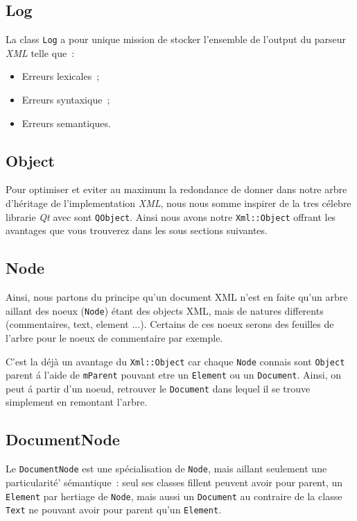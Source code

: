     \subsection{Log}
        La class \lstinline$Log$ a pour unique mission de stocker l'ensemble de l'output du parseur \textit{XML} telle que~:

        \begin{itemize}
            \item Erreurs lexicales~;
            \item Erreurs syntaxique~;
            \item Erreurs semantiques.
        \end{itemize}

    \subsection{Object}
        Pour optimiser et eviter au maximum la redondance de donner dans notre arbre d'h\'eritage de l'implementation \textit{XML}, nous nous somme inspirer de la tres c\'elebre librarie \textit{Qt} avec sont \lstinline$QObject$. Ainsi nous avons notre \lstinline$Xml::Object$ offrant les avantages que vous trouverez dans les sous sections suivantes.

    \subsection{Node}
        Ainsi, nous partons du principe qu'un document XML n'est en faite qu'un arbre aillant des noeux (\lstinline$Node$) \'etant des objects XML, mais de natures differents (commentaires, text, element ...). Certains de ces noeux serons des feuilles de l'arbre pour le noeux de commentaire par exemple.

        C'est la d\'ej\`a un avantage du \lstinline$Xml::Object$ car chaque \lstinline$Node$ connais sont \lstinline$Object$ parent \'a l'aide de \lstinline$mParent$ pouvant etre un \lstinline$Element$ ou un \lstinline$Document$. Ainsi, on peut \'a partir d'un noeud, retrouver le \lstinline$Document$ dans lequel il se trouve simplement en remontant l'arbre.

    \subsection{DocumentNode}
        Le \lstinline$DocumentNode$ est une sp\'ecialisation de \lstinline$Node$, mais aillant seulement une particularit\'e' s\'emantique~: seul ses classes fillent peuvent avoir pour parent, un \lstinline$Element$ par hertiage de \lstinline$Node$, mais aussi un \lstinline$Document$ au contraire de la classe \lstinline$Text$ ne pouvant avoir pour parent qu'un \lstinline$Element$.

